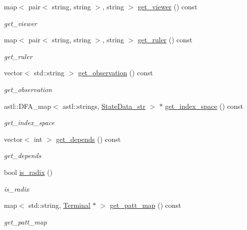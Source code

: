 \begin{DoxyCompactItemize}
map$<$ pair$<$ string, string $>$, string $>$ \hyperlink{class_problem_node_a2757bb8dbd2a6484d0fc16cf382f1d08}{get\+\_\+viewer} () const 
\begin{DoxyCompactList}\small\item\em get\+\_\+viewer \end{DoxyCompactList}\item 
map$<$ pair$<$ string, string $>$, string $>$ \hyperlink{class_problem_node_a2de3b5186ce76f1782a7dacb754825d7}{get\+\_\+ruler} () const 
\begin{DoxyCompactList}\small\item\em get\+\_\+ruler \end{DoxyCompactList}\item 
vector$<$ std\+::string $>$ \hyperlink{class_problem_node_abe5f148c704822a49331653d40bf5935}{get\+\_\+observation} () const 
\begin{DoxyCompactList}\small\item\em get\+\_\+observation \end{DoxyCompactList}\item 
astl\+::\+D\+F\+A\+\_\+map$<$ astl\+::strings, \hyperlink{class_state_data__str}{State\+Data\+\_\+str} $>$ $\ast$ \hyperlink{class_problem_node_a3eed067387419bc7bcce0c83ab5157a5}{get\+\_\+index\+\_\+space} () const 
\begin{DoxyCompactList}\small\item\em get\+\_\+index\+\_\+space \end{DoxyCompactList}\item 
vector$<$ int $>$ \hyperlink{class_problem_node_a430f7615bc2fe993127623326da650b2}{get\+\_\+depends} () const 
\begin{DoxyCompactList}\small\item\em get\+\_\+depends \end{DoxyCompactList}\item 
bool \hyperlink{class_problem_node_a8ac910812a8684b0dbc238b944a76973}{is\+\_\+radix} ()
\begin{DoxyCompactList}\small\item\em is\+\_\+radix \end{DoxyCompactList}\item 
map$<$ std\+::string, \hyperlink{class_terminal}{Terminal} $\ast$ $>$ \hyperlink{class_problem_node_a5ab8edec582d3492b8a353f48eef0a7b}{get\+\_\+patt\+\_\+map} () const 
\begin{DoxyCompactList}\small\item\em get\+\_\+patt\+\_\+map \end{DoxyCompactList}\item 

\end{DoxyCompactItemize}
